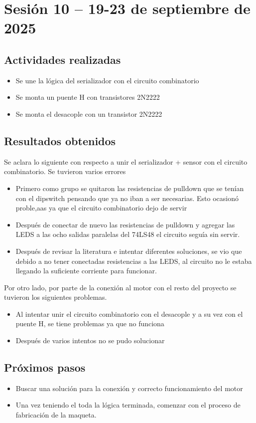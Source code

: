 \documentclass[12pt,letterpaper]{article}
\begin{document}
\section{Sesión 10 -- 19-23 de septiembre de 2025}
\subsection*{Actividades realizadas}
\begin{itemize}
    \item Se une la lógica del serializador con el circuito combinatorio
    \item Se monta un puente H con transistores 2N2222
    \item Se monta el desacople con un transistor 2N2222
\end{itemize}

\subsection*{Resultados obtenidos}
Se aclara lo siguiente con respecto a unir el serializador + sensor con el circuito combinatorio. Se tuvieron varios errores
\begin{itemize}
    \item Primero como grupo se quitaron las resistencias de pulldown que se tenían con el dipswitch pensando que ya no iban a ser necesarias. Esto ocasionó proble,aas ya que el circuito combinatorio dejo de servir
    \item Después de conectar de nuevo las resistencias de pulldown y agregar las LEDS a las ocho salidas paralelas del 74LS48 el circuito seguía sin servir.
    \item Después de revisar la literatura e intentar diferentes soluciones, se vio que debido a no tener conectadas resistencias a las LEDS, al circuito no le estaba llegando la suficiente corriente para funcionar.
\end{itemize}

Por otro lado, por parte de la conexión al motor con el resto del proyecto se tuvieron los siguientes problemas.
\begin{itemize}
    \item Al intentar unir el circuito combinatorio con el desacople y a su vez con el puente H, se tiene problemas ya que no funciona
    \item Después de varios intentos no se pudo solucionar
\end{itemize}

\subsection*{Próximos pasos}
\begin{itemize}
    \item Buscar una solución para la conexión y correcto funcionamiento del motor
    \item Una vez teniendo el toda la lógica terminada, comenzar con el proceso de fabricación de la maqueta.
\end{itemize}
\end{document}
